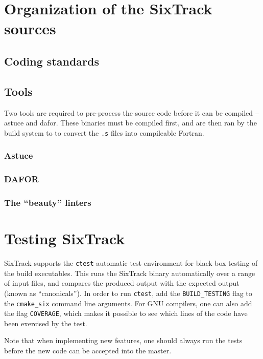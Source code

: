 \documentclass[english,BCOR=0mm,DIV=18]{scrartcl}
\begin{document}
\section{Organization of the SixTrack sources}

\subsection{Coding standards}

\subsection{Tools}

Two tools are required to pre-process the source code before it can be compiled -- astuce and dafor.
These binaries must be compiled first, and are then ran by the build system to to convert the \texttt{.s} files into compileable Fortran.

\subsubsection{Astuce}

\subsubsection{DAFOR}

\subsubsection{The ``beauty'' linters}


\section{Testing SixTrack}
\label{sec:testing}
SixTrack supports the \texttt{ctest} automatic test environment for black box testing of the build executables.
This runs the SixTrack binary automatically over a range of input files, and compares the produced output with the expected output (known as ``canonicals'').
In order to run \texttt{ctest}, add the \texttt{BUILD\_TESTING} flag to the \texttt{cmake\_six} command line arguments.
For GNU compilers, one can also add the flag \texttt{COVERAGE}, which makes it possible to see which lines of the code have been exercised by the test.

Note that when implementing new features, one should always run the tests before the new code can be accepted into the master.
\end{document}
